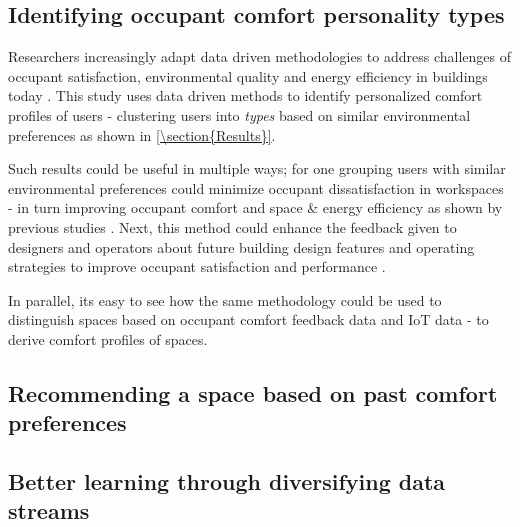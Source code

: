 \documentclass[]{interact}
\theoremstyle{plain}%
\theoremstyle{definition}
\theoremstyle{remark}
\begin{document}
\subsection{Identifying occupant comfort personality types}
Researchers increasingly adapt data driven methodologies to address challenges of occupant satisfaction, environmental quality and energy efficiency in buildings today \cite{Textmining, occupantcomplaints, IEQandsatisfaction}. This study uses data driven methods to identify personalized comfort profiles of users - clustering users into \emph{types} based on similar environmental preferences as shown in \ref{\section{Results}}. 

Such results could be useful in multiple ways; for one grouping users with similar environmental preferences could minimize occupant dissatisfaction in workspaces - in turn improving occupant comfort and space \& energy efficiency as shown by previous studies \cite{KAMARULZAMAN2011262}. Next, this method could enhance the feedback given to designers and operators about future building design features and operating strategies to improve occupant satisfaction and performance \cite{KWON2019356}.

In parallel, its easy to see how the same methodology could be used to distinguish spaces based on occupant comfort feedback data and IoT data - to derive comfort profiles of spaces.



\subsection{Recommending a space based on past comfort preferences}


\subsection{Better learning through diversifying data streams}
\end{document}
